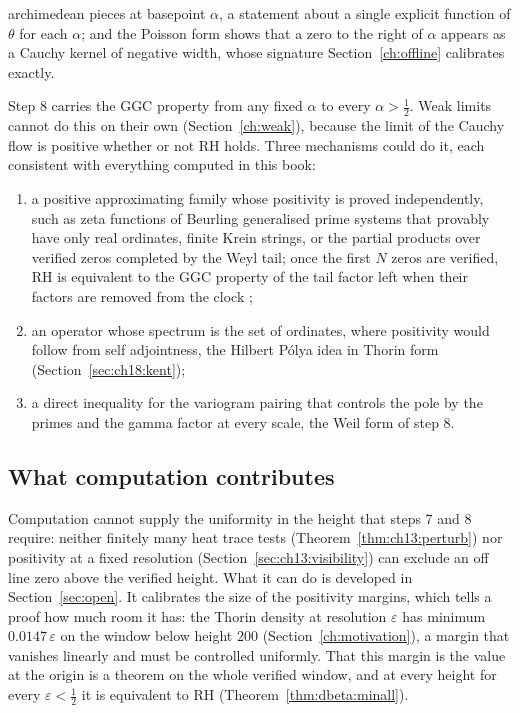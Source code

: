 archimedean pieces at basepoint $\alpha$, a statement about a single explicit function of $\theta$ for each $\alpha$; and the Poisson form shows that a zero to the right of $\alpha$ appears as a Cauchy kernel of negative width, whose signature Section~\ref{ch:offline} calibrates exactly.

Step 8 carries the GGC property from any fixed $\alpha$ to every $\alpha>\frac12$. Weak limits cannot do this on their own (Section~\ref{ch:weak}), because the limit of the Cauchy flow is positive whether or not RH holds. Three mechanisms could do it, each consistent with everything computed in this book:
\begin{enumerate}
\item a positive approximating family whose positivity is proved independently, such as zeta functions of Beurling generalised prime systems that provably have only real ordinates, finite Krein strings, or the partial products over verified zeros completed by the Weyl tail; once the first $N$ zeros are verified, RH is equivalent to the GGC property of the tail factor left when their factors are removed from the clock \cite[Corollary 18.11]{P26};
\item an operator whose spectrum is the set of ordinates, where positivity would follow from self adjointness, the Hilbert P\'olya idea in Thorin form (Section~\ref{sec:ch18:kent});
\item a direct inequality for the variogram pairing that controls the pole by the primes and the gamma factor at every scale, the Weil form of step 8.
\end{enumerate}

\subsection{What computation contributes}\label{sec:ch25:contrib}

Computation cannot supply the uniformity in the height that steps 7 and 8 require: neither finitely many heat trace tests (Theorem~\ref{thm:ch13:perturb}) nor positivity at a fixed resolution (Section~\ref{sec:ch13:visibility}) can exclude an off line zero above the verified height. What it can do is developed in Section~\ref{sec:open}. It calibrates the size of the positivity margins, which tells a proof how much room it has: the Thorin density at resolution $\varepsilon$ has minimum $0.0147\,\varepsilon$ on the window below height $200$ (Section~\ref{ch:motivation}), a margin that vanishes linearly and must be controlled uniformly. That this margin is the value at the origin is a theorem on the whole verified window, and at every height for every $\varepsilon<\frac12$ it is equivalent to RH (Theorem~\ref{thm:dbeta:minall}).

